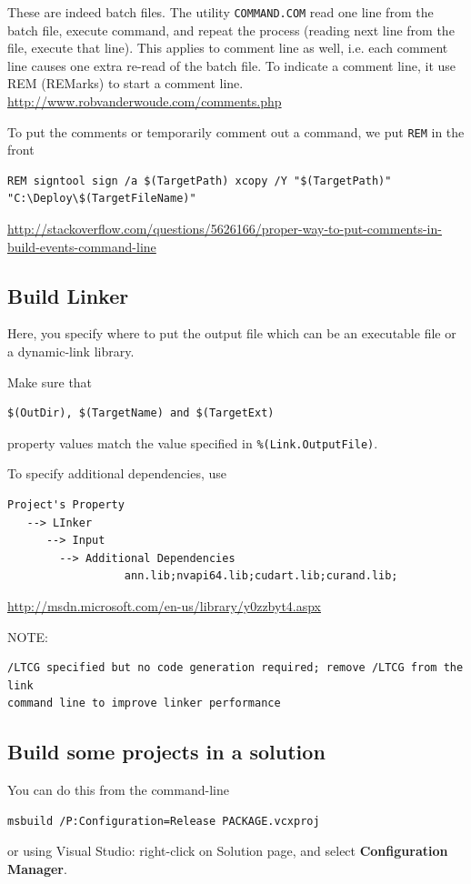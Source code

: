 These are indeed batch files. The utility \verb!COMMAND.COM! read one line
from the batch file, execute command, and repeat the process (reading next
line from the file, execute that line). This applies to comment line as well,
i.e. each comment line causes one extra re-read of the batch file. To indicate
a comment line, it use REM (REMarks) to start a comment line.
\url{http://www.robvanderwoude.com/comments.php}

To put the comments or temporarily comment out a command, we put \verb!REM! in
the front
\begin{verbatim}
REM signtool sign /a $(TargetPath) xcopy /Y "$(TargetPath)" "C:\Deploy\$(TargetFileName)"
\end{verbatim}
\url{http://stackoverflow.com/questions/5626166/proper-way-to-put-comments-in-build-events-command-line}

\subsection{Build Linker}

Here, you specify where to put the output file which can be an executable file
or a dynamic-link library.

Make sure that
\begin{verbatim}
$(OutDir), $(TargetName) and $(TargetExt) 
\end{verbatim}
property values match the value specified in \verb!%(Link.OutputFile)!.

To specify additional dependencies, use
\begin{verbatim}
Project's Property
   --> LInker
      --> Input
        --> Additional Dependencies
                  ann.lib;nvapi64.lib;cudart.lib;curand.lib;
\end{verbatim}

\url{http://msdn.microsoft.com/en-us/library/y0zzbyt4.aspx}

NOTE:
\begin{verbatim}
/LTCG specified but no code generation required; remove /LTCG from the link
command line to improve linker performance
\end{verbatim}


\subsection{Build some projects in a solution}	


You can do this from the command-line
\begin{verbatim}
msbuild /P:Configuration=Release PACKAGE.vcxproj
\end{verbatim}
or using Visual Studio: right-click on Solution page, and select {\bf
Configuration Manager}.

